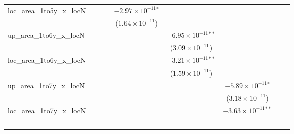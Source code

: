 \begin{tabular}{lcccccccc}
   loc\_area\_1to5y\_x\_locN     &                                &                                &                                & $-2.97\times 10^{-11}$$^{*}$   &                                &                                &                                &   \\   
                                 &                                &                                &                                & ($1.64\times 10^{-11}$)        &                                &                                &                                &   \\   
   up\_area\_1to6y\_x\_locN      &                                &                                &                                &                                & $-6.95\times 10^{-11}$$^{**}$  &                                &                                &   \\   
                                 &                                &                                &                                &                                & ($3.09\times 10^{-11}$)        &                                &                                &   \\   
   loc\_area\_1to6y\_x\_locN     &                                &                                &                                &                                & $-3.21\times 10^{-11}$$^{**}$  &                                &                                &   \\   
                                 &                                &                                &                                &                                & ($1.59\times 10^{-11}$)        &                                &                                &   \\   
   up\_area\_1to7y\_x\_locN      &                                &                                &                                &                                &                                & $-5.89\times 10^{-11}$$^{*}$   &                                &   \\   
                                 &                                &                                &                                &                                &                                & ($3.18\times 10^{-11}$)        &                                &   \\   
   loc\_area\_1to7y\_x\_locN     &                                &                                &                                &                                &                                & $-3.63\times 10^{-11}$$^{**}$  &                                &   \\   
$$
\end{tabular}
